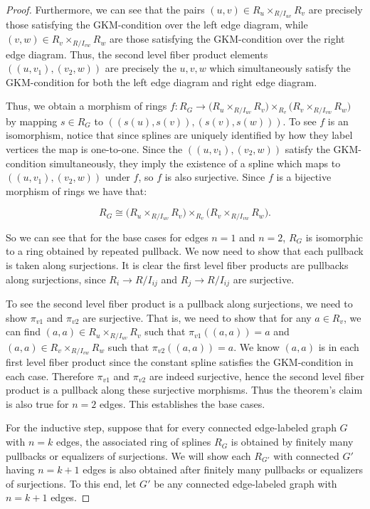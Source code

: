 \documentclass{article}
\begin{document}
\begin{proof}
Furthermore, we can see that the pairs $(u,v) \in R_u \times_{R/I_{uv}} R_v$ are precisely those satisfying the GKM-condition over the left edge diagram, while $(v, w) \in R_v \times_{R/I_{vw}} R_w$ are those satisfying the GKM-condition over the right edge diagram. Thus, the second level fiber product elements $((u, v_1), (v_2, w))$ are precisely the $u, v, w$ which simultaneously satisfy the GKM-condition for both the left edge diagram and right edge diagram. 

Thus, we obtain a morphism of rings $f: R_{G} \rightarrow \bigl(R_u \times_{R/I_{uv}} R_v\bigr)\! \times_{R_v}\! \bigl(R_v \times_{R/I_{vw}} R_w\bigr)$ by mapping $s \in R_{G}$ to $((s(u), s(v)), (s(v), s(w)))$. To see $f$ is an isomorphism, notice that since splines are uniquely identified by how they label vertices the map is one-to-one. Since the $((u, v_1), (v_2, w))$ satisfy the GKM-condition simultaneously, they imply the existence of a spline which maps to $((u, v_1), (v_2, w))$ under $f$, so $f$ is also surjective. Since $f$ is a bijective morphism of rings we have that:

\[
R_{G} \cong \bigl(R_u \times_{R/I_{uv}} R_v\bigr)\! \times_{R_v}\! \bigl(R_v \times_{R/I_{vw}} R_w\bigr).
\]

So we can see that for the base cases for edges $n=1$ and $n=2$, $R_{G}$ is isomorphic to a ring obtained by repeated pullback. We now need to show that each pullback is taken along surjections. It is clear the first level fiber products are pullbacks along surjections, since $R_{i} \rightarrow R/I_{ij}$ and $R_j \rightarrow R/I_{ij}$ are surjective. 

To see the second level fiber product is a pullback along surjections, we need to show $\pi_{v1}$ and $\pi_{v2}$ are surjective. That is, we need to show that for any $a \in R_v$, we can find $(a,a) \in R_u \times_{R/I_{uv}} R_v$ such that $\pi_{v1}((a,a)) = a$ and $(a,a) \in R_v \times_{R/I_{vw}} R_w$ such that $\pi_{v2}((a,a)) = a$. We know $(a,a)$ is in each first level fiber product since the constant spline satisfies the GKM-condition in each case. Therefore $\pi_{v1}$ and $\pi_{v2}$ are indeed surjective, hence the second level fiber product is a pullback along these surjective morphisms. Thus the theorem's claim is also true for $n=2$ edges. This establishes the base cases.

For the inductive step, suppose that for every connected edge-labeled graph $G$ with $n=k$ edges, the associated ring of splines $R_{G}$ is obtained by finitely many pullbacks or equalizers of surjections. We will show each $R_{G'}$ with connected $G'$ having $n=k+1$ edges is also obtained after finitely many pullbacks or equalizers of surjections. To this end, let $G'$ be any connected edge-labeled graph with $n=k+1$ edges.


\end{proof}
\end{document}
